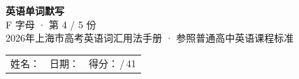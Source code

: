 \documentclass[10pt,a4paper]{article}
\begin{document}
\pagestyle{plain}

\begin{center}
{\LARGE\bfseries 英语单词默写}\\[0.22em]
{\large F 字母 · 第 4 / 5 份}\\[0.18em]
{\small 2026年上海市高考英语词汇用法手册 · 参照普通高中英语课程标准}
\end{center}

\vspace{0.25em}
\noindent\begin{tabular}{@{}p{}@{}p{}@{}p{}@{}}
姓名：\underline{\hspace{2.0cm}} & 日期：\underline{\hspace{2.0cm}} & 得分：\underline{\hspace{1.3cm}}\,/\,41 \\
\end{tabular}

\vspace{0.3em}

\vspace{0.08em}
\end{document}
